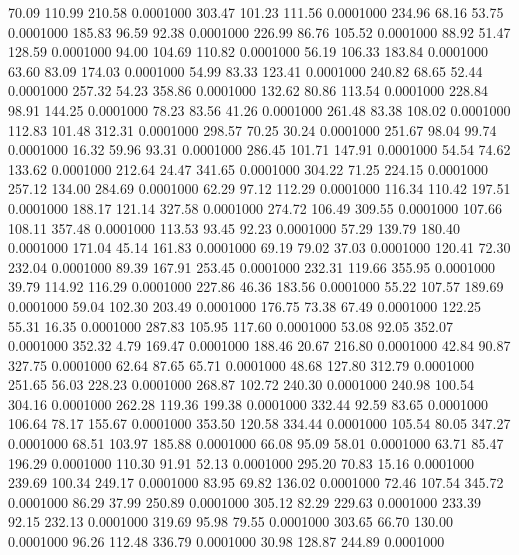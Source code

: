   70.09  110.99  210.58   0.0001000
 303.47  101.23  111.56   0.0001000
 234.96   68.16   53.75   0.0001000
 185.83   96.59   92.38   0.0001000
 226.99   86.76  105.52   0.0001000
  88.92   51.47  128.59   0.0001000
  94.00  104.69  110.82   0.0001000
  56.19  106.33  183.84   0.0001000
  63.60   83.09  174.03   0.0001000
  54.99   83.33  123.41   0.0001000
 240.82   68.65   52.44   0.0001000
 257.32   54.23  358.86   0.0001000
 132.62   80.86  113.54   0.0001000
 228.84   98.91  144.25   0.0001000
  78.23   83.56   41.26   0.0001000
 261.48   83.38  108.02   0.0001000
 112.83  101.48  312.31   0.0001000
 298.57   70.25   30.24   0.0001000
 251.67   98.04   99.74   0.0001000
  16.32   59.96   93.31   0.0001000
 286.45  101.71  147.91   0.0001000
  54.54   74.62  133.62   0.0001000
 212.64   24.47  341.65   0.0001000
 304.22   71.25  224.15   0.0001000
 257.12  134.00  284.69   0.0001000
  62.29   97.12  112.29   0.0001000
 116.34  110.42  197.51   0.0001000
 188.17  121.14  327.58   0.0001000
 274.72  106.49  309.55   0.0001000
 107.66  108.11  357.48   0.0001000
 113.53   93.45   92.23   0.0001000
  57.29  139.79  180.40   0.0001000
 171.04   45.14  161.83   0.0001000
  69.19   79.02   37.03   0.0001000
 120.41   72.30  232.04   0.0001000
  89.39  167.91  253.45   0.0001000
 232.31  119.66  355.95   0.0001000
  39.79  114.92  116.29   0.0001000
 227.86   46.36  183.56   0.0001000
  55.22  107.57  189.69   0.0001000
  59.04  102.30  203.49   0.0001000
 176.75   73.38   67.49   0.0001000
 122.25   55.31   16.35   0.0001000
 287.83  105.95  117.60   0.0001000
  53.08   92.05  352.07   0.0001000
 352.32    4.79  169.47   0.0001000
 188.46   20.67  216.80   0.0001000
  42.84   90.87  327.75   0.0001000
  62.64   87.65   65.71   0.0001000
  48.68  127.80  312.79   0.0001000
 251.65   56.03  228.23   0.0001000
 268.87  102.72  240.30   0.0001000
 240.98  100.54  304.16   0.0001000
 262.28  119.36  199.38   0.0001000
 332.44   92.59   83.65   0.0001000
 106.64   78.17  155.67   0.0001000
 353.50  120.58  334.44   0.0001000
 105.54   80.05  347.27   0.0001000
  68.51  103.97  185.88   0.0001000
  66.08   95.09   58.01   0.0001000
  63.71   85.47  196.29   0.0001000
 110.30   91.91   52.13   0.0001000
 295.20   70.83   15.16   0.0001000
 239.69  100.34  249.17   0.0001000
  83.95   69.82  136.02   0.0001000
  72.46  107.54  345.72   0.0001000
  86.29   37.99  250.89   0.0001000
 305.12   82.29  229.63   0.0001000
 233.39   92.15  232.13   0.0001000
 319.69   95.98   79.55   0.0001000
 303.65   66.70  130.00   0.0001000
  96.26  112.48  336.79   0.0001000
  30.98  128.87  244.89   0.0001000
